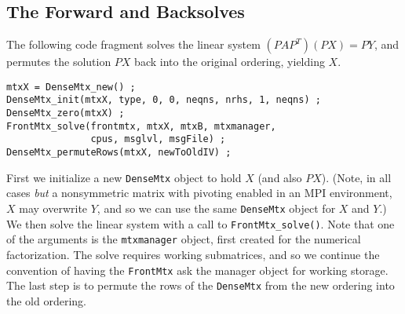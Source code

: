 \subsection{The Forward and Backsolves}
\label{subsection:serial:solve}
\par
The following code fragment solves the linear system 
$(PAP^T) (PX) = PY$,
and permutes the solution $PX$ back into the original ordering,
yielding $X$.
\begin{verbatim}
mtxX = DenseMtx_new() ;
DenseMtx_init(mtxX, type, 0, 0, neqns, nrhs, 1, neqns) ;
DenseMtx_zero(mtxX) ;
FrontMtx_solve(frontmtx, mtxX, mtxB, mtxmanager,
               cpus, msglvl, msgFile) ;
DenseMtx_permuteRows(mtxX, newToOldIV) ;
\end{verbatim}
First we initialize a new {\tt DenseMtx} object to hold $X$
(and also $PX$).
(Note, in all cases {\it but} a nonsymmetric matrix with pivoting 
enabled in an MPI environment, $X$ may overwrite $Y$, and so we 
can use the same {\tt DenseMtx} object for $X$ and $Y$.)
We then solve the linear system with a call to
{\tt FrontMtx\_solve()}.
Note that one of the arguments is the {\tt mtxmanager} object,
first created for the numerical factorization.
The solve requires working submatrices, and so we continue the
convention of having the {\tt FrontMtx} ask the manager object for
working storage.
The last step is to permute the rows of the {\tt DenseMtx}
from the new ordering into the old ordering.
\par
